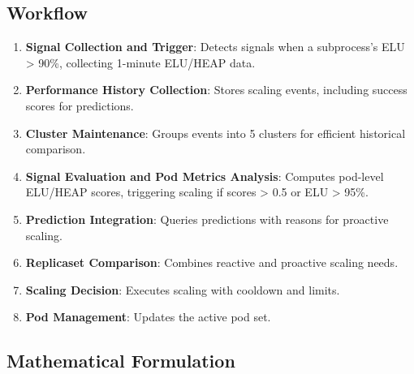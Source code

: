 \documentclass[12pt]{article}
\begin{document}
\subsection{Workflow}
\begin{enumerate}
    \item \textbf{Signal Collection and Trigger}: Detects signals when a subprocess’s ELU > 90\%, collecting 1-minute ELU/HEAP data.
    \item \textbf{Performance History Collection}: Stores scaling events, including success scores for predictions.
    \item \textbf{Cluster Maintenance}: Groups events into 5 clusters for efficient historical comparison.
    \item \textbf{Signal Evaluation and Pod Metrics Analysis}: Computes pod-level ELU/HEAP scores, triggering scaling if scores > 0.5 or ELU > 95\%.
    \item \textbf{Prediction Integration}: Queries predictions with reasons for proactive scaling.
    \item \textbf{Replicaset Comparison}: Combines reactive and proactive scaling needs.
    \item \textbf{Scaling Decision}: Executes scaling with cooldown and limits.
    \item \textbf{Pod Management}: Updates the active pod set.
\end{enumerate}

\subsection{Mathematical Formulation}
\end{document}
